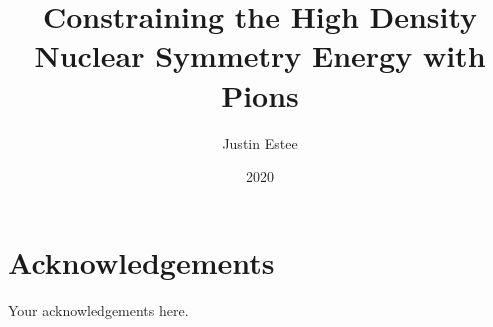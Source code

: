 \documentclass[]{msu-thesis}
\title{Constraining the High Density Nuclear Symmetry Energy with Pions}
\author{Justin Estee}
\date{2020}
\begin{document}

\frontmatter
\maketitlepage
\begin{abstract}
\end{abstract}

\clearpage

\makecopyrightpage

%
%
\clearpage
\chapter*{Acknowledgements}
\DoubleSpacing %
Your acknowledgements here.
%
\clearpage
\SingleSpacing
\tableofcontents* %
\clearpage
\listoftables %
\clearpage
\listoffigures %
%
%
\mainmatter
%


%





\end{document}
